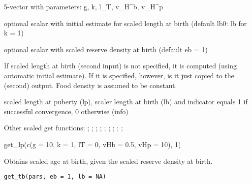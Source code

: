 \documentclass[a4paper]{book}
\begin{document}
%
\begin{Arguments}
\begin{ldescription}
\item[\code{pars}] 5-vector with parameters: g, k, l\_T, v\_H\textasciicircum{}b, v\_H\textasciicircum{}p

\item[\code{lb0}] optional scalar with initial estimate for scaled length at birth (default lb0: lb for k = 1)

\item[\code{eb}] optional scalar with scaled reserve density at birth (default eb = 1)
\end{ldescription}
\end{Arguments}
%
\begin{Details}\relax
If scaled length at birth (second input) is not specified, it is computed (using automatic initial estimate).
If it is specified, however, is it just copied to the (second) output. Food density is assumed to be constant.
\end{Details}
%
\begin{Value}
scaled length at puberty (lp), scaler length at birth (lb)
and indicator equals 1 if successful convergence, 0 otherwise (info)
\end{Value}
%
\begin{SeeAlso}\relax
Other scaled get functions: ;
; ;
; ;
; ;
;
;
\end{SeeAlso}
%
\begin{Examples}
\begin{ExampleCode}
get_lp(c(g = 10, k = 1, lT = 0, vHb = 0.5, vHp = 10), 1)
\end{ExampleCode}
\end{Examples}
%
\begin{Description}\relax
Obtains scaled age at birth, given the scaled reserve density at birth.
\end{Description}
%
\begin{Usage}
\begin{verbatim}
get_tb(pars, eb = 1, lb = NA)
\end{verbatim}
\end{Usage}
\end{document}
